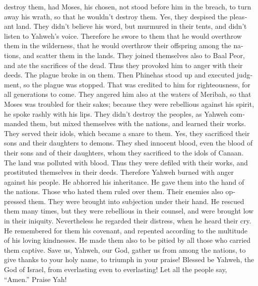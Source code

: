 \begin{paracol}{2}
\begin{otherlanguage}{english}
destroy them, had Moses, his chosen, not stood before him in the breach,
to turn away his wrath, so that he wouldn't destroy them.
 Yes, they despised the pleasant land. They didn't
believe his word,  but murmured in their tents, and
didn't listen to Yahweh's voice.  Therefore he swore to
them that he would overthrow them in the wilderness, 
that he would overthrow their offspring among the nations, and scatter
them in the lands.  They joined themselves also to Baal
Peor, and ate the sacrifices of the dead.  Thus they
provoked him to anger with their deeds. The plague broke in on them.
 Then Phinehas stood up and executed judgment, so the
plague was stopped.  That was credited to him for
righteousness, for all generations to come.  They angered
him also at the waters of Meribah, so that Moses was troubled for their
sakes;  because they were rebellious against his spirit,
he spoke rashly with his lips.  They didn't destroy the
peoples, as Yahweh commanded them,  but mixed themselves
with the nations, and learned their works.  They served
their idols, which became a snare to them.  Yes, they
sacrificed their sons and their daughters to demons. 
They shed innocent blood, even the blood of their sons and of their
daughters, whom they sacrificed to the idols of Canaan. The land was
polluted with blood.  Thus they were defiled with their
works, and prostituted themselves in their deeds. 
Therefore Yahweh burned with anger against his people. He abhorred his
inheritance.  He gave them into the hand of the nations.
Those who hated them ruled over them.  Their enemies also
oppressed them. They were brought into subjection under their hand.
 He rescued them many times, but they were rebellious in
their counsel, and were brought low in their iniquity. 
Nevertheless he regarded their distress, when he heard their cry.
 He remembered for them his covenant, and repented
according to the multitude of his loving kindnesses.  He
made them also to be pitied by all those who carried them captive.
 Save us, Yahweh, our God, gather us from among the
nations, to give thanks to your holy name, to triumph in your praise!
 Blessed be Yahweh, the God of Israel, from everlasting
even to everlasting! Let all the people say, ``Amen.'' Praise Yah!


\end{otherlanguage}
\end{paracol}
